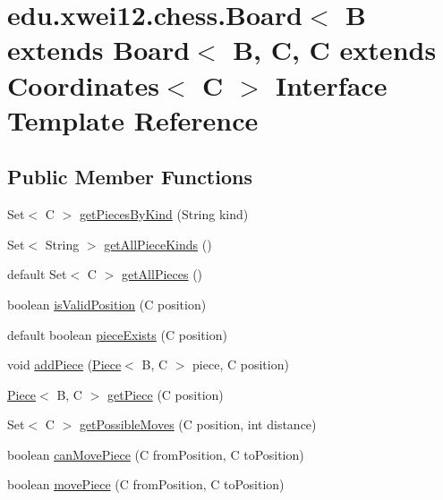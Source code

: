 \hypertarget{interfaceedu_1_1xwei12_1_1chess_1_1_board}{}\section{edu.\+xwei12.\+chess.\+Board$<$ B extends Board$<$ B, C, C extends Coordinates$<$ C $>$ Interface Template Reference}
\label{interfaceedu_1_1xwei12_1_1chess_1_1_board}
\subsection*{Public Member Functions}
\begin{DoxyCompactItemize}
\item 
Set$<$ C $>$ \hyperlink{interfaceedu_1_1xwei12_1_1chess_1_1_board_ab6987bdd5249265b6ff263575cce4edd}{get\+Pieces\+By\+Kind} (String kind)
\item 
Set$<$ String $>$ \hyperlink{interfaceedu_1_1xwei12_1_1chess_1_1_board_ab8326f6a94f341f0036a2f324e49e42f}{get\+All\+Piece\+Kinds} ()
\item 
default Set$<$ C $>$ \hyperlink{interfaceedu_1_1xwei12_1_1chess_1_1_board_a26cf9ba2ad248ab8a6bf1639ee52a582}{get\+All\+Pieces} ()
\item 
boolean \hyperlink{interfaceedu_1_1xwei12_1_1chess_1_1_board_a1bd017577a469f7b9acd4dc41de41b60}{is\+Valid\+Position} (C position)
\item 
default boolean \hyperlink{interfaceedu_1_1xwei12_1_1chess_1_1_board_a572fffc4594c2102f1c9d9e811b70077}{piece\+Exists} (C position)
\item 
void \hyperlink{interfaceedu_1_1xwei12_1_1chess_1_1_board_a173ea4ab159ea9c6861edceb0b57ed04}{add\+Piece} (\hyperlink{classedu_1_1xwei12_1_1chess_1_1_piece}{Piece}$<$ B, C $>$ piece, C position)
\item 
\hyperlink{classedu_1_1xwei12_1_1chess_1_1_piece}{Piece}$<$ B, C $>$ \hyperlink{interfaceedu_1_1xwei12_1_1chess_1_1_board_adb3b0da878c4b0ed8661439fa2e0aea5}{get\+Piece} (C position)
\item 
Set$<$ C $>$ \hyperlink{interfaceedu_1_1xwei12_1_1chess_1_1_board_a84dba341d217844baf3533634cf504b4}{get\+Possible\+Moves} (C position, int distance)
\item 
boolean \hyperlink{interfaceedu_1_1xwei12_1_1chess_1_1_board_ad39f31aab9d5776239ab5cbfb9f52f75}{can\+Move\+Piece} (C from\+Position, C to\+Position)
\item 
boolean \hyperlink{interfaceedu_1_1xwei12_1_1chess_1_1_board_a4954ead21a9d3d8476bc71bc8db8d175}{move\+Piece} (C from\+Position, C to\+Position)
\end{DoxyCompactItemize}


